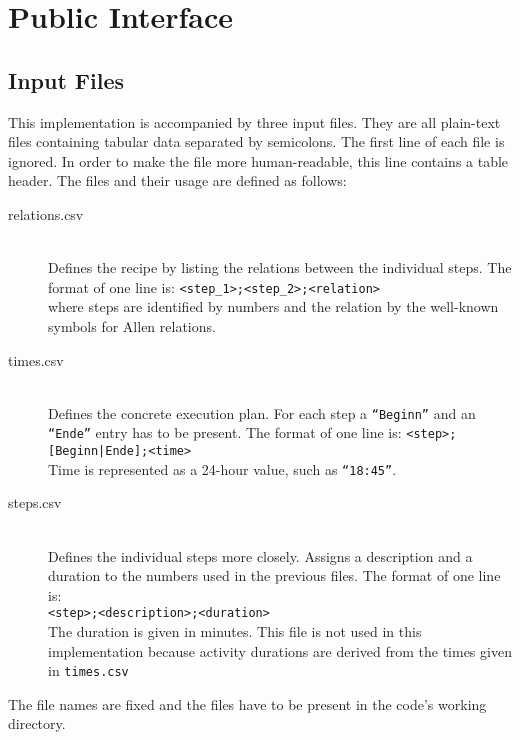 \chapter{Public Interface}

  \section{Input Files}
    
    This implementation is accompanied by three input files. They are all
    plain-text files containing tabular data separated by semicolons. The first line of
    each file is ignored. In order to make the file more human-readable, this
    line contains a table header. The files and their usage are defined as
    follows:
    
    \begin{description}
        \item[relations.csv] \hfill \\
            Defines the recipe by listing the relations between the individual
            steps. The format of one line is:
            \texttt{<step\_1>;<step\_2>;<relation>}\\
            where steps are identified by numbers and the relation by the
            well-known symbols for Allen relations.
        \item[times.csv] \hfill \\
            Defines the concrete execution plan. For each step a
            \texttt{``Beginn''} and an \texttt{``Ende''} entry has to be
            present.
            The format of one line is:
            \texttt{<step>;[Beginn|Ende];<time>}\\
            Time is represented as a 24-hour value, such as \texttt{``18:45''}.
        \item[steps.csv] \hfill \\
            Defines the individual steps more closely. Assigns a description and
            a duration to the numbers used in the previous files. The format of
            one line is:\\
            \texttt{<step>;<description>;<duration>}\\
            The duration is given in minutes. This file is not used in this
            implementation because activity durations are derived from the times
            given in \texttt{times.csv}
    \end{description}
    
    The file names are fixed and the files have to be present in the code's
    working directory.
      
